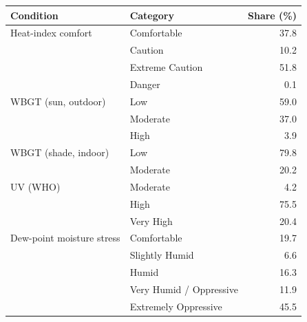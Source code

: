 \begin{tabular}{llr}
\toprule
Condition & Category & Share (\%) \\
\midrule
Heat-index comfort        & Comfortable             & 37.8 \\
                          & Caution                 & 10.2 \\
                          & Extreme Caution         & 51.8 \\
                          & Danger                  & 0.1 \\
\midrule
WBGT (sun, outdoor)       & Low                     & 59.0 \\
                          & Moderate                & 37.0 \\
                          & High                    & 3.9 \\
\midrule
WBGT (shade, indoor)      & Low                     & 79.8 \\
                          & Moderate                & 20.2 \\
\midrule
UV (WHO)                  & Moderate                & 4.2 \\
                          & High                    & 75.5 \\
                          & Very High               & 20.4 \\
\midrule
Dew-point moisture stress & Comfortable             & 19.7 \\
                          & Slightly Humid          & 6.6 \\
                          & Humid                   & 16.3 \\
                          & Very Humid / Oppressive & 11.9 \\
                          & Extremely Oppressive    & 45.5 \\
\bottomrule
\end{tabular}
